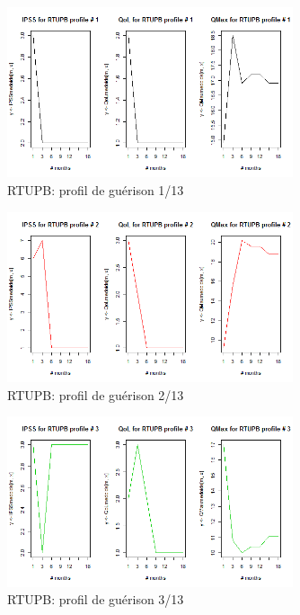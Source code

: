%
%

%

\begin{figure}[H]
\centering
\includegraphics[width=0.75\textwidth]{../Fig/RTUPB/rtupb-profil-post-01.png}
\caption{RTUPB: profil de guérison 1/13}
\end{figure}

\begin{figure}[H]
\centering
\includegraphics[width=0.75\textwidth]{../Fig/RTUPB/rtupb-profil-post-02.png}
\caption{RTUPB: profil de guérison 2/13}
\end{figure}

\begin{figure}[H]
\centering
\includegraphics[width=0.75\textwidth]{../Fig/RTUPB/rtupb-profil-post-03.png}
\caption{RTUPB: profil de guérison 3/13}
\end{figure}

